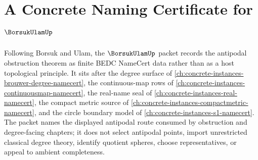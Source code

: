 \chapter{A Concrete Naming Certificate for $\BorsukUlamUp$}
\label{ch:concrete-instances-borsuk-ulam-namecert}

Following Borsuk and Ulam, the $\BorsukUlamUp$ packet records the antipodal obstruction theorem as finite BEDC NameCert data rather than as a host topological principle. It sits after the degree surface of \autoref{ch:concrete-instances-brouwer-degree-namecert}, the continuous-map rows of \autoref{ch:concrete-instances-continuousmap-namecert}, the real-name seal of \autoref{ch:concrete-instances-real-namecert}, the compact metric source of \autoref{ch:concrete-instances-compactmetric-namecert}, and the circle boundary model of \autoref{ch:concrete-instances-s1-namecert}. The packet names the displayed antipodal route consumed by obstruction and degree-facing chapters; it does not select antipodal points, import unrestricted classical degree theory, identify quotient spheres, choose representatives, or appeal to ambient completeness.

